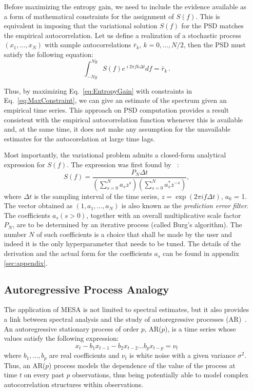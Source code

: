 \documentclass{aa}
\begin{document}
Before maximizing the entropy gain, we need to include the evidence available as a form of mathematical constraints for the assignment of $S(f)$.
This is equivalent in imposing that the variational solution $S(f)$ for the PSD matches the empirical autocorrelation.
Let us define a realization of a stochastic process $(x_1,\ldots,x_N)$ with sample autocorrelations $\bar r_k,\,k=0,\ldots, N/2$, then the PSD must satisfy the following equation:
\begin{equation}\label{eq:MaxConstraint}
\int_{-Ny}^{Ny} S(f) e^{\imath 2 \pi f k \Delta t} df = \bar r_{k}\,.
\end{equation}

Thus, by maximizing Eq.~\eqref{eq:EntropyGain} with constraints in Eq.~\eqref{eq:MaxConstraint}, we can give an estimate of the spectrum given an empirical time series.
This approach on PSD computation provides a result consistent with the empirical autocorrelation function whenever this is available and, at the same time, it does not make any assumption for the unavailable estimates for the autocorelation at large time lags.

Most importantly, the variational problem admits a closed-form analytical expression for $S(f)$.
The expression was first found by ~\citet{burg1975maximum}:
\begin{equation}\label{eq:MESApsd}
    S(f) = \frac{P_N \Delta t}{\left(\sum_{s=0}^{N} a_s z^s\right)\left(\sum_{s = 0}^N a^*_s z^{-s}\right)}, 
\end{equation}
where $\Delta t$ is the sampling interval of the time series, $z=\exp{(2\pi i f\Delta t)}$, $a_0$ = 1.
The vector obtained as $(1, a_1, \dots, a_N)$ is also known as the \textit{prediction error filter}.
The coefficients $a_s (s > 0)$, together with an overall multiplicative scale factor $P_N$, are to be determined by an iterative process (called Burg's algorithm). The number $N$ of such coefficients is a choice that shall be made by the user and indeed it is the only hyperparameter that needs to be tuned. The details of the derivation and the actual form for the coefficients $a_s$ can be found in appendix \ref{sec:appendix}.

\subsection{Autoregressive Process Analogy} \label{sec:autoregr}

The application of MESA is not limited to spectral estimates, but it also provides a link between spectral analysis and the study
of autoregressive processes (AR)~\citep{doi:10.1029/RG013i001p00183}.
An autoregressive stationary process of order $p$, AR($p$), is a time series whose values satisfy the following expression: 
\begin{equation} \label{eq:AR_p}
    x_t - b_1 x_{t-1} - b_2 x_{t-2} \dots b_p x_{t - p} = \nu_t
\end{equation}
where $b_1, \ldots, b_p$ are real coefficients and $\nu_t$ is white noise with a given variance $\sigma^2$.
Thus, an AR($p$) process models the dependence of the value of the process at time $t$ on every past $p$ observations, 
thus being potentially able to model complex autocorrelation structures within observations.
\end{document}
